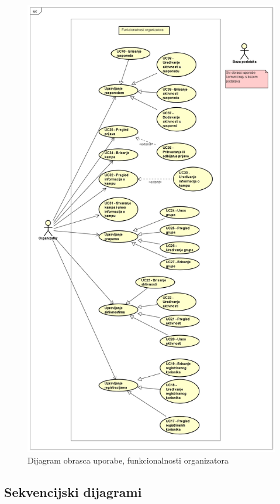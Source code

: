 				\begin{figure}[H]
					\centerline{\includegraphics[width=\textwidth, height=0.9\textheight]{slike/UC_organizator.png}}
					\caption{Dijagram obrasca uporabe, funkcionalnosti organizatora}
					\label{fig:ucOrganizator}
				\end{figure}
			
			
			\eject		
				
			\subsection{Sekvencijski dijagrami}

